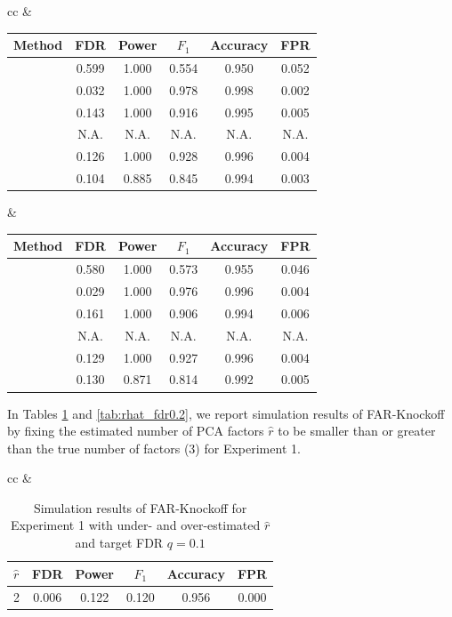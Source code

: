 ﻿\documentclass[12pt]{article}
\newcommand{\0}{\mbox{\bf 0}}
\theoremstyle{plain}%
\theoremstyle{definition}
\begin{document}
{\begin{table}[htbp]
\begin{tabular}{cc}
 &  \\
\begin{tabular}{lccccc}
\toprule
Method & FDR & Power & $F_1$ & Accuracy & FPR \\
\midrule
\sc{Lasso}         &     0.599  & 1.000  & 0.554  & 0.950  & 0.052  \\
\sc{FarmSelect}    &     0.032  & 1.000  & 0.978  & 0.998  & 0.002  \\
\sc{Model-X}       &    0.143  & 1.000  & 0.916  & 0.995  & 0.005  \\
\sc{Fixed-X}       & N.A.  & N.A.  & N.A.  & N.A.  & N.A.  \\
\sc{TSKI }         &     0.126  & 1.000  & 0.928  & 0.996  & 0.004  \\
\sc{FAR-Knockoff} & 0.104 & 0.885 & 0.845 & 0.994 & 0.003 \\

\bottomrule
\end{tabular}
&
\begin{tabular}{lccccc}
\toprule
Method & FDR & Power & $F_1$ & Accuracy & FPR \\
\midrule
\sc{Lasso}         &     0.580  & 1.000  & 0.573  & 0.955  & 0.046  \\
\sc{FarmSelect}    &    0.029  & 1.000  & 0.976  & 0.996  & 0.004  \\
\sc{Model-X}       &     0.161  & 1.000  & 0.906  & 0.994  & 0.006  \\
\sc{Fixed-X}       & N.A.  & N.A.  & N.A.  & N.A.  & N.A.  \\
\sc{TSKI}          &    0.129  & 1.000  & 0.927  & 0.996  & 0.004  \\
\sc{FAR-Knockoff} & 0.130 & 0.871 & 0.814 & 0.992 & 0.005 \\

\bottomrule
\end{tabular}
\end{tabular}
\end{table}



In Tables \ref{tab:rhat_fdr0.1} and \ref{tab:rhat_fdr0.2}, we report simulation results of FAR-Knockoff by fixing the estimated number of PCA factors $\widehat{r}$ to be smaller than or greater than the true number of factors (3) for Experiment 1. 

\begin{table}[htbp]
\caption{Simulation results of FAR-Knockoff for Experiment 1 with under- and over-estimated $\widehat{r}$ and target FDR $q = 0.1$}
\label{tab:rhat_fdr0.1}
\centering
\scriptsize
\setlength{\tabcolsep}{4pt}
\renewcommand{\arraystretch}{1.05}
\begin{tabular}{cc}
 &  \\
\begin{tabular}{lccccc}
\toprule
$\widehat{r}$ & FDR & Power & $F_1$ & Accuracy & FPR \\
\midrule
2 & 0.006 & 0.122 & 0.120 & 0.956 & 0.000 \\


\end{tabular}
\end{tabular}
\end{table}}
\end{document}
